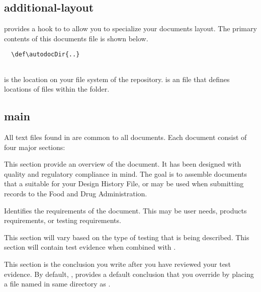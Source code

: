 \subsection{additional-layout}
\skTlcArticle provides a hook to \skAdditionalLayout to allow you to specialize
your documents layout.  The primary contents of this documents
\skAdditionalLayout file is shown below.

\begin{verbatim}
  \def\autodocDir{..}
  
\end{verbatim}

\skAutoDocDir is the location on your file system of the \skAutoDoc repository.
\skProjectDirTex is an \skAutoDoc file that defines locations of files within
the \skAutoDoc folder.

\subsection{main}
All text files found in \skBoilerplate are common to all \skAutoDoc documents.
Each document consist of four major sections:

\begin{description}[leftmargin=3cm, style=nextline]
  \item[Overview:] This section provide an overview of the document.  It has
    been designed with quality and regulatory compliance in mind.  The goal is
    to assemble documents that a suitable for your Design History File, or may
    be used when submitting records to the Food and Drug Administration.

  \item[Requirements:] Identifies the requirements of the document.  This may be
    user needs, products requirements, or testing requirements.

  \item[Test Plan Overview:] This section will vary based on the type of testing
    that is being described.  This section will contain test evidence when
    combined with \skAmber.

  \item[Conclusion:] This section is the conclusion you write after you have
    reviewed your test evidence.  By default, \skAutoDoc, provides a default
    conclusion that you override by placing a file named \skConclusion in same
    directory as \skStarterkit.

\end{description}

